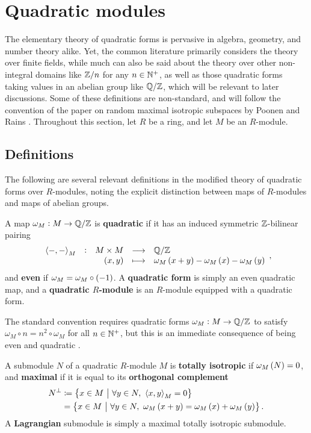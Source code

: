 \section{Quadratic modules}

The elementary theory of quadratic forms is pervasive in algebra, geometry, and number theory alike. Yet, the common literature primarily considers the theory over finite fields, while much can also be said about the theory over other non-integral domains like $ \mathbb{Z} / n $ for any $ n \in \mathbb{N}^+ $, as well as those quadratic forms taking values in an abelian group like $ \mathbb{Q} / \mathbb{Z} $, which will be relevant to later discussions. Some of these definitions are non-standard, and will follow the convention of the paper on random maximal isotropic subspaces by Poonen and Rains \cite{PR12}. Throughout this section, let $ R $ be a ring, and let $ M $ be an $ R $-module.

\subsection{Definitions}

The following are several relevant definitions in the modified theory of quadratic forms over $ R $-modules, noting the explicit distinction between maps of $ R $-modules and maps of abelian groups.

\begin{definition}
A map $ \omega_M : M \to \mathbb{Q} / \mathbb{Z} $ is \textbf{quadratic} if it has an induced symmetric $ \mathbb{Z} $-bilinear pairing
$$ \function[\abr{-, -}_M]{M \times M}{\QQ / \ZZ}{\br{x, y}}{\omega_M\br{x + y} - \omega_M\br{x} - \omega_M\br{y}}, $$
and \textbf{even} if $ \omega_M = \omega_M \circ \br{-1} $. A \textbf{quadratic form} is simply an even quadratic map, and a \textbf{quadratic $ R $-module} is an $ R $-module equipped with a quadratic form.
\end{definition}

\begin{remark}
The standard convention requires quadratic forms $ \omega_M : M \to \mathbb{Q} / \mathbb{Z} $ to satisfy $ \omega_M \circ n = n^2 \circ \omega_M $ for all $ n \in \mathbb{N}^+ $, but this is an immediate consequence of being even and quadratic \cite[Remark 2.1]{PR12}.
\end{remark}

\begin{definition}
A submodule $ N $ of a quadratic $ R $-module $ M $ is \textbf{totally isotropic} if $ \omega_M\br{N} = 0 $, and \textbf{maximal} if it is equal to its \textbf{orthogonal complement}
\begin{align*}
N^\perp
& \coloneqq \cbr{x \in M \st \forall y \in N, \ \abr{x, y}_M = 0} \\
& = \cbr{x \in M \st \forall y \in N, \ \omega_M\br{x + y} = \omega_M\br{x} + \omega_M\br{y}}.
\end{align*}
A \textbf{Lagrangian} submodule is simply a maximal totally isotropic submodule.
\end{definition}

